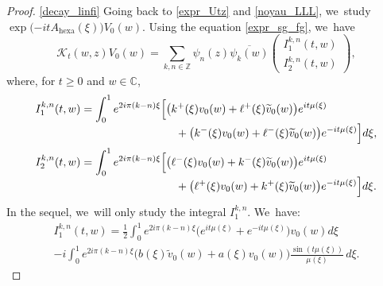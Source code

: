 \documentclass[10pt]{amsart}
\theoremstyle{definition}
\let\EE\exp
\let\ov\overline
\newcommand\C{\mathbb C}
\newcommand\Z{\mathbb Z}
\newcommand{\bpa}[1]{\bigl(#1\bigr)}
\providecommand{\skpt}{\par\smallskip\noindent}
\begin{document}
\skpt
\begin{proof}
\eqref{decay_linfi}
Going back to \eqref{expr_Utz} and \eqref{noyau_LLL}, we~study $\EE\bigl({-itA_{\mathrm{hexa}}(\xi) }\bigr)V_0(w)$. Using the equation \eqref{expr_sg_fg}, we~have\vspace*{-3pt}
\begin{equation*}
\mathcal{K}_t(w,z)V_0(w) = \sum_{k,n\in\Z}\psi_n(z) \ov{\psi_k(w)} \begin{pmatrix} I_1^{k,n}(t,w) \\[2pt] I_2^{k,n}(t,w) \end{pmatrix},
\end{equation*}
where, for $t \geq 0$ and $w \in \C$,\vspace*{-3pt}
\begin{align*}
I_1^{k,n}(t,w) &= \int_0^1 e^{ {2i\pi(k-n)} \xi}\Big[\bigl(k^+(\xi)v_0(w)+ \ell^+(\xi)\widetilde{v}_0(w)\bigr)e^{it\mu(\xi)}\\[-3pt]
&\hspace*{3cm}+\bigl(k^-(\xi)v_0(w)+ \ell^-(\xi)\widetilde{v}_0(w)\bigr)e^{-it\mu(\xi)}\Big]d\xi,
\\
I_2^{k,n}(t,w) &= \int_0^1 e^{ {2i\pi(k-n)} \xi}\Big[\bigl(\ell^-(\xi)v_0(w)+ k^-(\xi)\widetilde{v}_0(w)\bigr)e^{it\mu(\xi)}\\[-3pt]
&\hspace*{3cm}+ \bigl(\ell^+(\xi)v_0(w)+ k^+(\xi)\widetilde{v}_0(w)\bigr) e^{-it\mu(\xi)}\Big]d\xi.
\end{align*}
In the sequel, we~will only study the integral $I_1^{k,n}$. We~have:
\begin{multline*}
I_1^{k,n}(t,w) = \frac{1}{2}\int_0^1 e^{2i\pi(k-n)\xi}\bpa{e^{it\mu(\xi)}+e^{-it\mu(\xi)}}v_0(w) d\xi \\
- i \int_0^1 e^{{2i\pi(k-n)}\xi}\bigl(b(\xi)\widetilde{v}_0(w)+a(\xi)v_0(w)\bigr) \frac{\sin(t\mu(\xi))}{\mu(\xi)}\, d\xi.
\end{multline*}


\end{proof}
\end{document}
